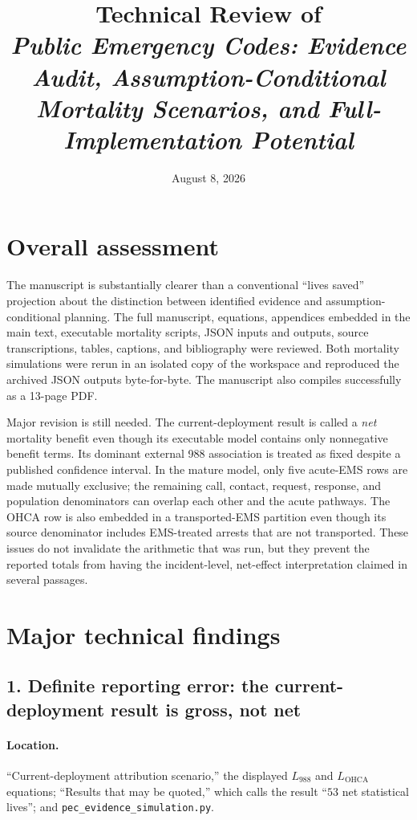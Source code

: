 \documentclass[11pt]{article}
\title{Technical Review of\\
\emph{Public Emergency Codes: Evidence Audit, Assumption-Conditional Mortality
Scenarios, and Full-Implementation Potential}}
\author{}
\date{August 8, 2026}
\begin{document}
\maketitle

\section*{Overall assessment}

The manuscript is substantially clearer than a conventional ``lives saved''
projection about the distinction between identified evidence and
assumption-conditional planning.  The full manuscript, equations, appendices
embedded in the main text, executable mortality scripts, JSON inputs and
outputs, source transcriptions, tables, captions, and bibliography were
reviewed.  Both mortality simulations were rerun in an isolated copy of the
workspace and reproduced the archived JSON outputs byte-for-byte.  The
manuscript also compiles successfully as a 13-page PDF.

Major revision is still needed.  The current-deployment result is called a
\emph{net} mortality benefit even though its executable model contains only
nonnegative benefit terms.  Its dominant external 988 association is treated
as fixed despite a published confidence interval.  In the mature model, only
five acute-EMS rows are made mutually exclusive; the remaining call, contact,
request, response, and population denominators can overlap each other and the
acute pathways.  The OHCA row is also embedded in a transported-EMS partition
even though its source denominator includes EMS-treated arrests that are not
transported.  These issues do not invalidate the arithmetic that was run, but
they prevent the reported totals from having the incident-level, net-effect
interpretation claimed in several passages.

\section*{Major technical findings}

\subsection*{1. Definite reporting error: the current-deployment result is gross, not net}

\paragraph{Location.}
``Current-deployment attribution scenario,'' the displayed $L_{988}$ and
$L_{\mathrm{OHCA}}$ equations; ``Results that may be quoted,'' which calls the result
``$53$ net statistical lives''; and
\texttt{pec\_evidence\_simulation.py}.
\end{document}
